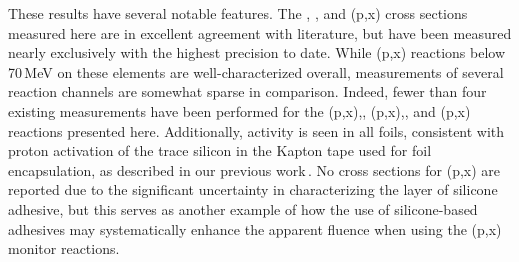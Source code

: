 
% 



These results have several notable features.
The 
, , and (p,x) cross sections measured here are in excellent agreement with 
literature,  but have been measured nearly exclusively with the highest precision to date.
While (p,x) reactions below 70\,MeV on these elements are well-characterized overall, measurements of several reaction channels are somewhat sparse in comparison.
Indeed, fewer than four existing measurements have been performed for the (p,x),, (p,x),, and (p,x)
reactions presented here.
Additionally,  activity is seen in all foils, consistent with proton activation of the trace  silicon in the Kapton tape used for foil encapsulation, as described in our previous work\,\cite{Voyles2018a}.
No cross sections for (p,x) are reported due to the significant uncertainty in characterizing the layer of silicone adhesive, but this serves as another example of how the use of silicone-based adhesives may systematically enhance the apparent fluence when using the (p,x) monitor reactions.


